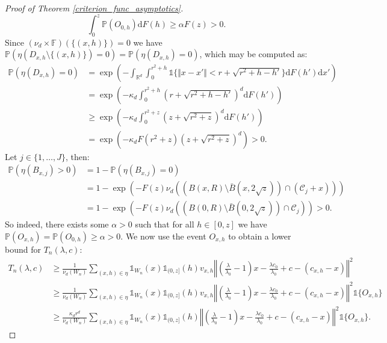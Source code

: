 \documentclass{article}
\newcommand{\RR}{\mathbb{R}}
\newcommand{\PP}{\mathbb{P}}
\theoremstyle{plain}
\theoremstyle{remark}
\theoremstyle{definition}
\begin{document}
\begin{proof}[Proof of Theorem \ref{criterion_func_asymptotics}]
    \begin{equation}
        \int_0^z \PP(O_{0,h})\mathrm{d}F(h) \geq \alpha F(z) > 0.
    \end{equation}
    Since $(\nu_d \times \mathbb{F})(\{(x,h)\}) = 0$ we have $\PP(\eta(D_{x,h}\setminus \{(x,h)\})=0) = \PP(\eta(D_{x,h}) =0)$, which may be computed as:
    {\allowdisplaybreaks
    \begin{align*}
        \PP(\eta(D_{x,h}) =0) &= \exp\left(- \int_{\RR^d}\int_0^{r^2+h}\mathds{1}\{\Vert x -x'\Vert < r + \sqrt{r^2 + h -h'}\}\mathrm{d}F(h')\mathrm{d}x' \right)\\
        &= \exp\left(-\kappa_d \int_0^{r^2+h}\left(r + \sqrt{r^2 + h -h'} \right)^d\mathrm{d}F(h') \right)\\
        &\geq  \exp\left(-\kappa_d \int_0^{r^2+z}\left(z + \sqrt{r^2 + z} \right)^d\mathrm{d}F(h') \right) \\
        &= \exp\left(-\kappa_d F(r^2 + z)\left(z + \sqrt{r^2 + z} \right)^d \right) > 0.
    \end{align*}
    }
    Let $j \in \{1,\dots, J\}$, then:
    \begin{align*}
        \PP\left(\eta(B_{x,j}) > 0  \right) &= 1- \PP\left(\eta(B_{x,j}) = 0  \right)\\
        &= 1 - \exp\left(- F(z)\nu_d\left(\left(B(x,R)\setminus\bar{B}(x,2\sqrt{z})\right)  \cap (\mathcal{C}_j + x)\right)\right) \\
        &= 1 - \exp\left(- F(z)\nu_d\left(\left(B(0,R)\setminus\bar{B}(0,2\sqrt{z})\right)  \cap \mathcal{C}_j\right)\right) > 0.
    \end{align*}
    So indeed, there exists some $\alpha > 0$ such that for all $h \in [0,z]$ we have $\PP(O_{x,h}) = \PP(O_{0,h}) \geq \alpha > 0$. We now use the event $O_{x,h}$ to obtain a lower bound for $T_n(\lambda,c)$:
    \begin{align*}
        T_n(\lambda,c) &\geq\frac{1}{\nu_d(W_n)}\sum_{(x,h) \in \eta} \mathds{1}_{W_n}(x)\mathds{1}_{(0,z]}(h)v_{x,h}\left\Vert \left(\frac{\lambda}{\lambda_0}-1\right)x -\frac{\lambda c_0}{\lambda_0} + c - (c_{x,h}-x) \right\Vert^2 \\
        &\geq \frac{1}{\nu_d(W_n)}\sum_{(x,h) \in \eta} \mathds{1}_{W_n}(x)\mathds{1}_{(0,z]}(h)v_{x,h}\left\Vert \left(\frac{\lambda}{\lambda_0}-1\right)x -\frac{\lambda c_0}{\lambda_0} + c - (c_{x,h}-x) \right\Vert^2 \mathds{1}\{O_{x,h}\}\\
        &\geq \frac{\kappa_d r^d}{\nu_d(W_n)}\sum_{(x,h) \in \eta} \mathds{1}_{W_n}(x)\mathds{1}_{(0,z]}(h)\left\Vert \left(\frac{\lambda}{\lambda_0}-1\right)x -\frac{\lambda c_0}{\lambda_0} + c - (c_{x,h}-x) \right\Vert^2 \mathds{1}\{O_{x,h}\}.

\end{align*}
\end{proof}
\end{document}
